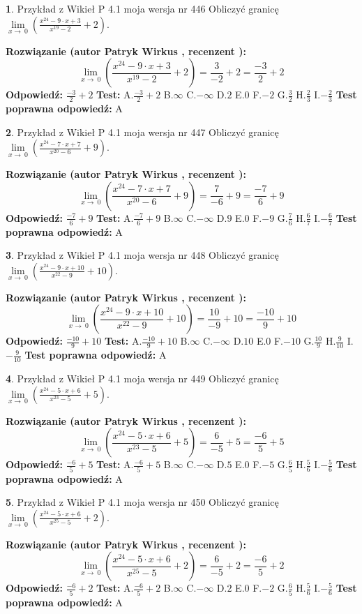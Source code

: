 \documentclass[12pt, a4paper]{article}
\theoremstyle{definition} %
\newtheorem{zad}{}
\newcommand{\zadStart}[1]{\begin{zad}#1\newline}
\newcommand{\zadStop}{\end{zad}}
\newcommand{\rozwStart}[2]{\noindent \textbf{Rozwiązanie (autor #1 , recenzent #2): }\newline}
\newcommand{\rozwStop}{\newline}
\newcommand{\odpStart}{\noindent \textbf{Odpowiedź:}\newline}
\newcommand{\odpStop}{\newline}
\newcommand{\testStart}{\noindent \textbf{Test:}\newline}
\newcommand{\testStop}{\newline}
\newcommand{\kluczStart}{\noindent \textbf{Test poprawna odpowiedź:}\newline}
\newcommand{\kluczStop}{\newline}
\begin{document}
\zadStart{Przykład z Wikieł P 4.1 moja wersja nr 446}
Obliczyć granicę $\lim\limits_{x\to\ 0}(\frac{x^{24}-9 \cdot x +3}{x^{19}-2}+2)$.
\zadStop
\rozwStart{Patryk Wirkus}{}
$$\lim\limits_{x\to\ 0}(\frac{x^{24}-9 \cdot x +3}{x^{19}-2}+2)=\frac{3}{-2}+2=\frac{-3}{2}+2$$
\rozwStop
\odpStart
$\frac{-3}{2}+2$
\odpStop
\testStart
A.$\frac{-3}{2}+2$
B.$\infty$
C.$-\infty$
D.$2$
E.$0$
F.$-2$
G.$\frac{3}{2}$
H.$\frac{2}{3}$
I.$-\frac{2}{3}$
\testStop
\kluczStart
A
\kluczStop



\zadStart{Przykład z Wikieł P 4.1 moja wersja nr 447}
Obliczyć granicę $\lim\limits_{x\to\ 0}(\frac{x^{24}-7 \cdot x +7}{x^{20}-6}+9)$.
\zadStop
\rozwStart{Patryk Wirkus}{}
$$\lim\limits_{x\to\ 0}(\frac{x^{24}-7 \cdot x +7}{x^{20}-6}+9)=\frac{7}{-6}+9=\frac{-7}{6}+9$$
\rozwStop
\odpStart
$\frac{-7}{6}+9$
\odpStop
\testStart
A.$\frac{-7}{6}+9$
B.$\infty$
C.$-\infty$
D.$9$
E.$0$
F.$-9$
G.$\frac{7}{6}$
H.$\frac{6}{7}$
I.$-\frac{6}{7}$
\testStop
\kluczStart
A
\kluczStop



\zadStart{Przykład z Wikieł P 4.1 moja wersja nr 448}
Obliczyć granicę $\lim\limits_{x\to\ 0}(\frac{x^{24}-9 \cdot x +10}{x^{22}-9}+10)$.
\zadStop
\rozwStart{Patryk Wirkus}{}
$$\lim\limits_{x\to\ 0}(\frac{x^{24}-9 \cdot x +10}{x^{22}-9}+10)=\frac{10}{-9}+10=\frac{-10}{9}+10$$
\rozwStop
\odpStart
$\frac{-10}{9}+10$
\odpStop
\testStart
A.$\frac{-10}{9}+10$
B.$\infty$
C.$-\infty$
D.$10$
E.$0$
F.$-10$
G.$\frac{10}{9}$
H.$\frac{9}{10}$
I.$-\frac{9}{10}$
\testStop
\kluczStart
A
\kluczStop



\zadStart{Przykład z Wikieł P 4.1 moja wersja nr 449}
Obliczyć granicę $\lim\limits_{x\to\ 0}(\frac{x^{24}-5 \cdot x +6}{x^{23}-5}+5)$.
\zadStop
\rozwStart{Patryk Wirkus}{}
$$\lim\limits_{x\to\ 0}(\frac{x^{24}-5 \cdot x +6}{x^{23}-5}+5)=\frac{6}{-5}+5=\frac{-6}{5}+5$$
\rozwStop
\odpStart
$\frac{-6}{5}+5$
\odpStop
\testStart
A.$\frac{-6}{5}+5$
B.$\infty$
C.$-\infty$
D.$5$
E.$0$
F.$-5$
G.$\frac{6}{5}$
H.$\frac{5}{6}$
I.$-\frac{5}{6}$
\testStop
\kluczStart
A
\kluczStop



\zadStart{Przykład z Wikieł P 4.1 moja wersja nr 450}
Obliczyć granicę $\lim\limits_{x\to\ 0}(\frac{x^{24}-5 \cdot x +6}{x^{25}-5}+2)$.
\zadStop
\rozwStart{Patryk Wirkus}{}
$$\lim\limits_{x\to\ 0}(\frac{x^{24}-5 \cdot x +6}{x^{25}-5}+2)=\frac{6}{-5}+2=\frac{-6}{5}+2$$
\rozwStop
\odpStart
$\frac{-6}{5}+2$
\odpStop
\testStart
A.$\frac{-6}{5}+2$
B.$\infty$
C.$-\infty$
D.$2$
E.$0$
F.$-2$
G.$\frac{6}{5}$
H.$\frac{5}{6}$
I.$-\frac{5}{6}$
\testStop
\kluczStart
A
\kluczStop
\end{document}
